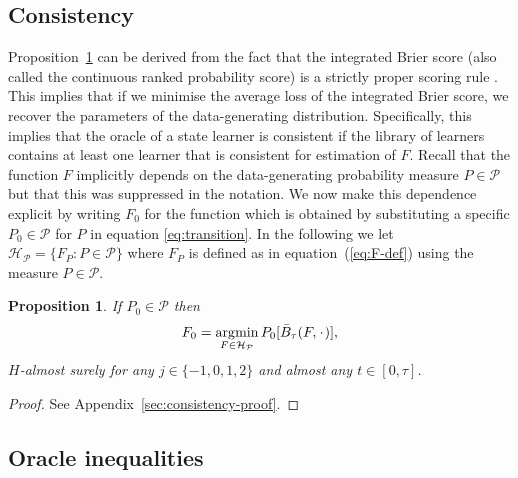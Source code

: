 \documentclass[11pt]{article}
\theoremstyle{thmstyleone}%
\newtheorem{proposition}{Proposition}
\theoremstyle{thmstyletwo}%
\theoremstyle{thmstylethree}%
\DeclareMathOperator{\E}{\mathbb{E}} %
\newcommand{\blank}{\makebox[1ex]{\textbf{$\cdot$}}}
\renewcommand{\phi}{\varphi}
\newcommand{\1}{\mathds{1}}
\DeclareMathOperator*{\argmin}{\arg\!\min}
\begin{document}
\subsection{Consistency}
\label{sec:consistency}

Proposition~\ref{prop:stric-prop} can be derived from the fact that the
integrated Brier score (also called the continuous ranked probability score) is
a strictly proper scoring rule \citep{gneiting2007strictly}. This implies that
if we minimise the average loss of the integrated Brier score, we recover the
parameters of the data-generating distribution. Specifically, this implies that
the oracle of a state learner is consistent if the library of learners contains
at least one learner that is consistent for estimation of \( F \). Recall that
the function \(F\) implicitly depends on the data-generating probability measure
\(P\in\mathcal P\) but that this was suppressed in the notation. We now make
this dependence explicit by writing \(F_0\) for the function which is obtained
by substituting a specific \(P_0\in\mathcal{P}\) for \(P\) in equation
\eqref{eq:transition}. In the following we let
\( \mathcal{H}_{\mathcal{P}} = \{F_P : P \in \mathcal{P}\} \) where \( F_P \) is defined as in
equation~(\ref{eq:F-def}) using the measure \( P \in \mathcal{P} \).

\begin{proposition}
  \label{prop:stric-prop}
  If \(P_0\in\mathcal{P}\) then
  \begin{equation*}
    F_0 = \argmin_{F \in \mathcal{H}_{\mathcal{P}}} P_0{[\bar{B}_\tau(F, \blank)]},
  \end{equation*}
  \( H \)-almost surely for any \( j\in \{-1,0,1,2\} \) and almost any
  \( t \in [0, \tau]\).
\end{proposition}
\begin{proof}
  See Appendix~\ref{sec:consistency-proof}.
\end{proof}

\subsection{Oracle inequalities}
\label{sec:finite-sample-oracle}
\end{document}
